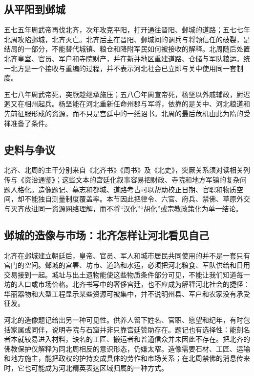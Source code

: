 \subsection{从平阳到邺城}

五七五年周武帝再伐北齐，次年攻克平阳，打开通往晋阳、邺城的道路；\hypertarget{evt:NSL-440-589-260}{\textcolor{dynasty}{五七七年北周攻陷邺城，北齐灭亡}}。北齐后主在晋阳、邺城间的调兵与将领信任的破裂，是结局的一部分，不能替代城镇、粮仓和降附军民如何被接收的解释。北周随后处置北齐皇室、官员、军户和寺院财产，并在新并地区重建道路、仓储与军队粮运。统一北方是一个接收与重编的过程，并不表示河北社会已立即与关中使用同一套制度。

五七八年周武帝死，突厥趁继承施压；五八〇年周宣帝死，杨坚以外戚辅政，尉迟迥又在相州起兵。杨坚能在河北重新任命州郡与军将，依靠的是关中、河北粮道和先前征服形成的资源，而不只是宫廷中的一纸诏书。北周的最后危机由此为隋的受禅准备了条件。

\subsection{史料与争议}

北齐、北周的主干分别来自《北齐书》《周书》及《北史》，突厥关系须对读相关列传与《资治通鉴》；这些文本的宫廷化叙事容易把财政、寺院和地方军镇的复杂问题人格化。造像题记、墓志和都城、道路考古可以帮助校正日期、官职和物质空间，却不能独自测量制度覆盖率。本节因此把律令、六官、府兵、禁佛、草原外交与灭齐放进同一资源网络理解，而不将“汉化”“胡化”或宗教政策化为单一结论。

\subsection{邺城的造像与市场：北齐怎样让河北看见自己}

北齐在邺城建立朝廷后，皇帝、官员、军人和城市居民共同使用的并不是一套只有宫门的空间。邺城的宫署、坊市、道路和水运，必须把河北粮食、军队供给和日用交易接到一起。城址与出土遗物能使这些物质条件部分可见，不能让我们知道每一坊的人口或市场价格。北齐书写中的奢侈宫廷，也不应成为解释河北社会的捷径：华丽器物和大型工程显示某些资源可被集中，并不说明州县、军户和农家没有承受征发。

河北的造像题记给出另一种可见性。供养人留下姓名、官职、愿望和纪年，有时包括家属或同伴，说明寺院与石窟并非只靠宫廷赞助存在。题记也有选择性：能刻名者本就较易进入材料，缺名的工匠、搬运者和普通信众并未因此不存在。把北齐的佛教保护仅解释为同北周相反的意识形态，仍嫌太窄。造像需要石材、工匠、运输和地方施主，能把政权的护持变成具体的劳作和市场关系；在北周禁佛的消息传来时，它也可能成为河北精英表达区域归属的一种方式。


